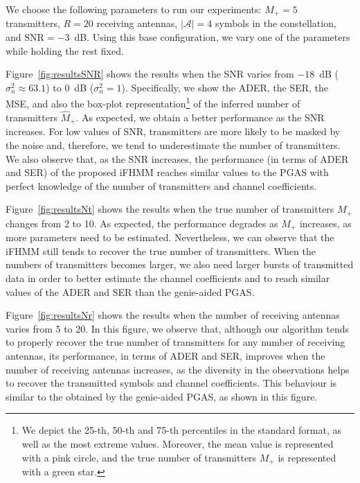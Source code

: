 \documentclass[a4paper]{article}
\def\Acal{\mathcal{A}}
\begin{document}
We choose the following parameters to run our experiments: $M_+=5$ transmitters, $R=20$ receiving antennas, $|\Acal|=4$ symbols in the constellation, and $\textrm{SNR}=-3$~dB. Using this base configuration, we vary one of the parameters while holding the rest fixed.

Figure~\ref{fig:resultsSNR} shows the results when the SNR varies from $-18$~dB ($\sigma_n^2\approx 63.1$) to $0$~dB ($\sigma_n^2=1$). Specifically, we show the ADER, the SER, the MSE, and also the box-plot representation\footnote{We depict the 25-th, 50-th and 75-th percentiles in the standard format, as well as the most extreme values. Moreover, the mean value is represented with a pink circle, and the true number of transmitters $M_+$ is represented with a green star.} of the inferred number of transmitters $\hat{M}_+$. As expected, we obtain a better performance as the SNR increases. For low values of SNR, transmitters are more likely to be masked by the noise and, therefore, we tend to underestimate the number of transmitters. We also observe that, as the SNR increases, the performance (in terms of ADER and SER) of the proposed iFHMM reaches similar values to the PGAS with perfect knowledge of the number of transmitters and channel coefficients.

Figure~\ref{fig:resultsNt} shows the results when the true number of transmitters $M_+$ changes from 2 to 10. As expected, the performance degrades as $M_+$ increases, as more parameters need to be estimated. Nevertheless, we can observe that the iFHMM still tends to recover the true number of transmitters. When the numbers of transmitters becomes larger, we also need larger bursts of transmitted data in order to better estimate the channel coefficients and to reach similar values of the ADER and SER than the genie-aided PGAS.

Figure~\ref{fig:resultsNr} shows the results when the number of receiving antennas varies from 5 to 20. In this figure, we observe that, although our algorithm tends to properly recover the true number of transmitters for any number of receiving antennas, its performance, in terms of ADER and SER, improves when the number of receiving antennas increases, as the diversity in the observations helps to recover the transmitted symbols and channel coefficients. This behaviour is similar to the obtained by the genie-aided PGAS, as shown in this figure.
\end{document}
